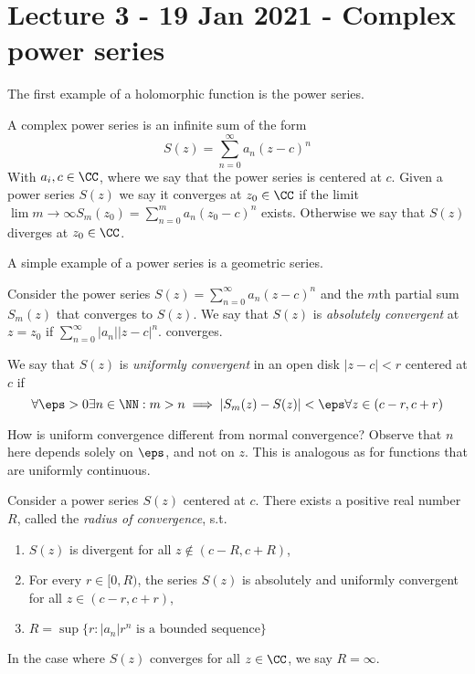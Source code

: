 \section{Lecture 3 - 19 Jan 2021 - Complex power series}
The first example of a holomorphic function is the power series.
\begin{definition}
  A complex power series is an infinite sum of the form
  \[S(z) = \sum_{n=0}^{\infty}a_n(z-c)^n\]
  With $a_i,c\in\CC$, where we say that the power series is centered at $c$.
  Given a power series $S(z)$ we say it converges at $z_0\in\CC$ if the limit
  $\lim m\to\infty S_m(z_0)=\sum_{n=0}^{m} a_n(z_0-c)^n$ exists. Otherwise we
  say that $S(z)$ diverges at $z_0\in\CC$.
  \label{def:powerSeries}
\end{definition}
A simple example of a power series is a geometric series.
\begin{definition}
  Consider the power series $S(z)=\sum_{n=0}^{\infty}a_n(z-c)^n$ and the $m$th
  partial sum $S_m(z)$ that converges to $S(z)$. We say that $S(z)$ is
  \emph{absolutely convergent} at $z=z_0$ if $\sum_{n=0}^{\infty}|a_n||z-c|^n$.
  converges.

  We say that $S(z)$ is \emph{uniformly convergent} in an open disk $|z-c|<r$
  centered at $c$ if 
  \[\forall \eps>0 \exists n\in\NN : m>n \implies |S_m(z)-S(z)|<\eps \forall
  z\in(c-r,c+r)\]
\end{definition}
\begin{remark}
  How is uniform convergence different from normal convergence? Observe that $n$
  here depends solely on $\eps$, and not on $z$. This is analogous as for
  functions that are uniformly continuous.
\end{remark}

\begin{theorem}
  Consider a power series $S(z)$ centered at $c$. There exists a positive real
  number $R$, called the \emph{radius of convergence}, s.t. 
  \begin{enumerate}
    \item $S(z)$ is divergent for all $z\not\in (c-R,c+R)$,
    \item For every $r\in[0,R)$, the series $S(z)$ is absolutely and uniformly
      convergent for all $z\in(c-r,c+r)$,
    \item $R=\sup\{r: |a_n|r^n \text{ is a bounded sequence}\}$
  \end{enumerate}
  In the case where $S(z)$ converges for all $z\in\CC$, we say $R=\infty$.
  \label{def:radiusOfConvergence}
\end{theorem}

